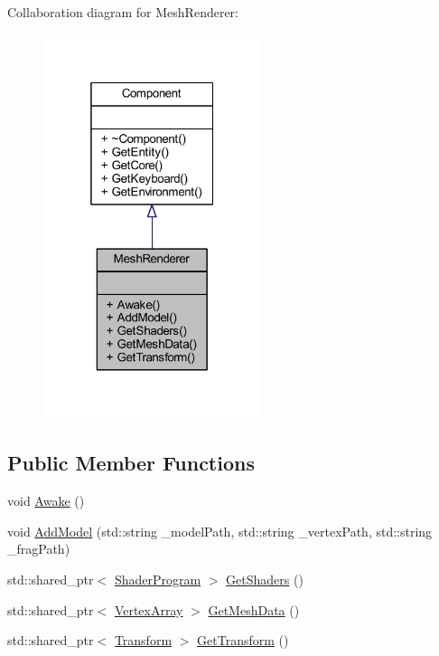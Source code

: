 Collaboration diagram for Mesh\+Renderer\+:
\nopagebreak
\begin{figure}[H]
\begin{center}
\leavevmode
\includegraphics[width=181pt]{class_mesh_renderer__coll__graph}
\end{center}
\end{figure}
\subsection*{Public Member Functions}
\begin{DoxyCompactItemize}
\item 
void \mbox{\hyperlink{class_mesh_renderer_a3fc0e9658d3b9a53e3559cb9b939aeb9}{Awake}} ()
\item 
void \mbox{\hyperlink{class_mesh_renderer_a90798e723067ca8c721f0c96c1609972}{Add\+Model}} (std\+::string \+\_\+model\+Path, std\+::string \+\_\+vertex\+Path, std\+::string \+\_\+frag\+Path)
\item 
std\+::shared\+\_\+ptr$<$ \mbox{\hyperlink{class_shader_program}{Shader\+Program}} $>$ \mbox{\hyperlink{class_mesh_renderer_a07be90e4601d54e0870854cc91dc018c}{Get\+Shaders}} ()
\item 
std\+::shared\+\_\+ptr$<$ \mbox{\hyperlink{class_vertex_array}{Vertex\+Array}} $>$ \mbox{\hyperlink{class_mesh_renderer_a2924155f99c9276a2089ff618f9016c8}{Get\+Mesh\+Data}} ()
\item 
std\+::shared\+\_\+ptr$<$ \mbox{\hyperlink{class_transform}{Transform}} $>$ \mbox{\hyperlink{class_mesh_renderer_a89beac4cf0a91a275686c5f5507af465}{Get\+Transform}} ()
\end{DoxyCompactItemize}


